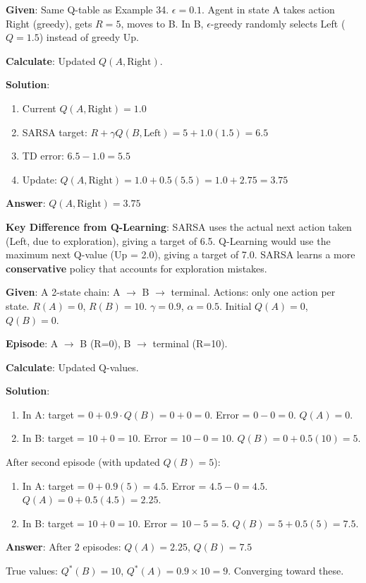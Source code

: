 \documentclass[11pt,a4paper]{article}
\begin{document}
\begin{tcolorbox}[colback=green!5!white,colframe=green!75!black,title=\textbf{Worked Example 35: SARSA With Exploration}]
\textbf{Given}: Same Q-table as Example 34. $\epsilon = 0.1$. Agent in state A takes action Right (greedy), gets $R = 5$, moves to B. In B, $\epsilon$-greedy randomly selects Left ($Q = 1.5$) instead of greedy Up.

\textbf{Calculate}: Updated $Q(A, \text{Right})$.

\textbf{Solution}:
\begin{enumerate}
    \item Current $Q(A, \text{Right}) = 1.0$
    \item SARSA target: $R + \gamma Q(B, \text{Left}) = 5 + 1.0(1.5) = 6.5$
    \item TD error: $6.5 - 1.0 = 5.5$
    \item Update: $Q(A, \text{Right}) = 1.0 + 0.5(5.5) = 1.0 + 2.75 = 3.75$
\end{enumerate}

\textbf{Answer}: $Q(A, \text{Right}) = 3.75$

\textbf{Key Difference from Q-Learning}: SARSA uses the actual next action taken (Left, due to exploration), giving a target of 6.5. Q-Learning would use the maximum next Q-value (Up = 2.0), giving a target of 7.0. SARSA learns a more \textbf{conservative} policy that accounts for exploration mistakes.
\end{tcolorbox}

\begin{tcolorbox}[colback=green!5!white,colframe=green!75!black,title=\textbf{Worked Example 36: SARSA Episode Walkthrough}]
\textbf{Given}: A 2-state chain: A $\to$ B $\to$ terminal. Actions: only one action per state. $R(A) = 0$, $R(B) = 10$. $\gamma = 0.9$, $\alpha = 0.5$. Initial $Q(A) = 0$, $Q(B) = 0$.

\textbf{Episode}: A $\to$ B (R=0), B $\to$ terminal (R=10).

\textbf{Calculate}: Updated Q-values.

\textbf{Solution}:
\begin{enumerate}
    \item In A: target = $0 + 0.9 \cdot Q(B) = 0 + 0 = 0$. Error = $0 - 0 = 0$. $Q(A) = 0$.
    \item In B: target = $10 + 0 = 10$. Error = $10 - 0 = 10$. $Q(B) = 0 + 0.5(10) = 5$.
\end{enumerate}

After second episode (with updated $Q(B) = 5$):
\begin{enumerate}
    \item In A: target = $0 + 0.9(5) = 4.5$. Error = $4.5 - 0 = 4.5$. $Q(A) = 0 + 0.5(4.5) = 2.25$.
    \item In B: target = $10 + 0 = 10$. Error = $10 - 5 = 5$. $Q(B) = 5 + 0.5(5) = 7.5$.
\end{enumerate}

\textbf{Answer}: After 2 episodes: $Q(A) = 2.25$, $Q(B) = 7.5$

True values: $Q^*(B) = 10$, $Q^*(A) = 0.9 \times 10 = 9$. Converging toward these.
\end{tcolorbox}
\end{document}
